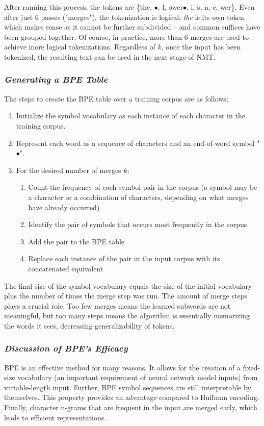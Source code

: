 After running this process, the tokens are \{the, $\bullet$, l, ower$\bullet$, i, s, n, e, wer\}. Even after just 6 passes ("merges"), the tokenization is logical: \textit{the} is its own token – which makes sense as it cannot be further subdivided – and common suffices have been grouped together. Of course, in practice, more than 6 merges are used to achieve more logical tokenizations. Regardless of $k$, once the input has been tokenized, the resulting text can be used in the next stage of NMT. 

\subsubsection*{\textit{\small{Generating a BPE Table}}} 

The steps to create the BPE table over a training corpus are as follows:
\begin{enumerate}[itemsep=0mm, topsep=0mm]
  \item Initialize the symbol vocabulary as each instance of each character in the training corpus. 
  \item Represent each word as a sequence of characters and an end-of-word symbol "$\bullet$".
  \item For the desired number of merges $k$:
  \begin{enumerate}[itemsep=0mm, topsep=0mm]
    \item Count the frequency of each symbol pair in the corpus (a symbol may be a character or a combination of characters, depending on what merges have already occurred)
    \item Identify the pair of symbols that occurs most frequently in the corpus
    \item Add the pair to the BPE table
    \item Replace each instance of the pair in the input corpus with its concatenated equivalent
  \end{enumerate}
\end{enumerate}

The final size of the symbol vocabulary equals the size of the initial vocabulary plus the number of times the merge step was run. The amount of merge steps plays a crucial role. Too few merges means the learned subwords are not meaningful, but too many steps means the algorithm is essentially memorizing the words it sees, decreasing generalizability of tokens. 

\subsubsection*{\textit{\small{Discussion of BPE's Efficacy}}} 
BPE is an effective method for many reasons. It allows for the creation of a fixed-size vocabulary (an important requirement of neural network model inputs) from variable-length input. Further, BPE symbol sequences are still interpretable by themselves. This property provides an advantage compared to Huffman encoding. Finally, character n-grams that are frequent in the input are merged early, which leads to efficient representations. 

